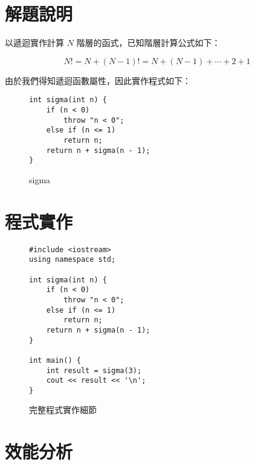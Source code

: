 \documentclass[12pt]{report}
\begin{document}
\maketitle
\tableofcontents

\chapter{解題說明}

\hspace{2em}以遞迴實作計算 $N$ 階層的函式，已知階層計算公式如下：

$$
N! = N+(N-1)!=N+(N-1)+\cdots +2+1
$$

由於我們得知遞迴函數屬性，因此實作程式如下：

\begin{figure}[ht]
    \begin{verbatim}
int sigma(int n) {
    if (n < 0)
        throw "n < 0";
    else if (n <= 1)
        return n;
    return n + sigma(n - 1);
}
    \end{verbatim}

    \captionsetup{justification=centering}
    \caption{sigma}
    \label{fig:sigma}
\end{figure}


\chapter{程式實作}

\begin{figure}[ht]
    \begin{verbatim}
#include <iostream>
using namespace std;

int sigma(int n) {
    if (n < 0)
        throw "n < 0";
    else if (n <= 1)
        return n;
    return n + sigma(n - 1);
}

int main() {
    int result = sigma(3);
    cout << result << '\n';
}
    \end{verbatim}
    \captionsetup{justification=centering}
    \caption{完整程式實作細節}
    \label{fig:完整程式實作細節}
\end{figure}

\chapter{效能分析}
\end{document}
